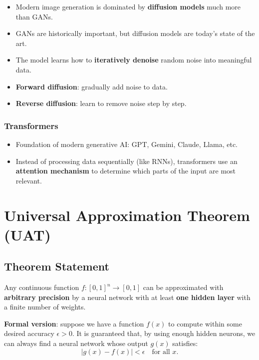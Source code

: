 \documentclass[11pt,a4paper]{article}
\begin{document}
\begin{itemize}[leftmargin=*]
    \item Modern image generation is dominated by \textbf{diffusion models} much more than GANs.
    \item GANs are historically important, but diffusion models are today's state of the art.
    \item The model learns how to \textbf{iteratively denoise} random noise into meaningful data.
    \item \textbf{Forward diffusion}: gradually add noise to data.
    \item \textbf{Reverse diffusion}: learn to remove noise step by step.
\end{itemize}

\subsubsection{Transformers}

\begin{itemize}[leftmargin=*]
    \item Foundation of modern generative AI: GPT, Gemini, Claude, Llama, etc.
    \item Instead of processing data sequentially (like RNNs), transformers use an \textbf{attention mechanism} to determine which parts of the input are most relevant.
\end{itemize}

\newpage
\section{Universal Approximation Theorem (UAT)}

\subsection{Theorem Statement}

\begin{theorembox}[title=Universal Approximation Theorem]
Any continuous function $f: [0,1]^n \to [0,1]$ can be approximated with \textbf{arbitrary precision} by a neural network with at least \textbf{one hidden layer} with a finite number of weights.
\end{theorembox}

\textbf{Formal version}: suppose we have a function $f(x)$ to compute within some desired accuracy $\epsilon > 0$. It is guaranteed that, by using enough hidden neurons, we can always find a neural network whose output $g(x)$ satisfies:
\[
|g(x) - f(x)| < \epsilon \quad \text{for all } x.
\]
\end{document}
